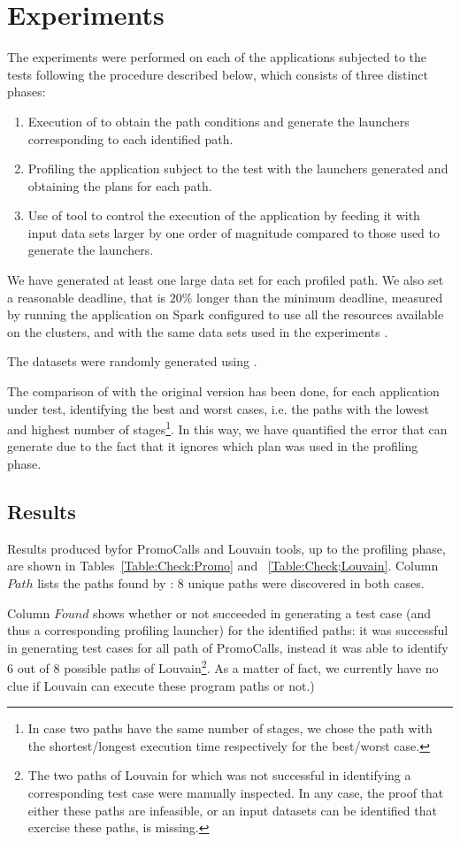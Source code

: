 \section{Experiments}\label{sec:experiments}
The experiments were performed on each of the applications subjected to the tests following the procedure described below, which consists of three distinct phases:
\begin{enumerate}[$1 $]
	\item Execution of \dSymb to obtain the path conditions and generate the launchers corresponding to each identified path.
	\item Profiling the application subject to the test with the launchers generated and obtaining the plans for each path.
	\item Use of tool to control the execution of the application by feeding it with input data sets larger by one order of magnitude compared to those used to generate the launchers.
\end{enumerate}
We have generated at least one large data set for each profiled path. We also set a reasonable deadline, that is $ 20\% $ longer than the minimum deadline, measured by running the application on Spark configured to use all the resources available on the clusters, and with the same data sets used in the experiments .

The datasets were randomly generated using \dSymb.

The comparison of \tool with the original \cSpark version has been done, for each application under test, identifying the best and worst cases, i.e. the paths with the lowest and highest number of stages\footnote{In case two paths have the same number of stages, we chose the path with the shortest/longest execution time  respectively for the best/worst case.}. In this way, we have quantified the error that \cSpark can generate due to the fact that it ignores which plan was used in the profiling phase.

\subsection{Results}
Results produced by\tool for PromoCalls and Louvain tools, up to the profiling phase, are shown in Tables~\ref{Table:Check:Promo} and ~\ref{Table:Check;Louvain}. Column $Path$ lists the paths found by \dSymb: $8$ unique paths were discovered in both cases. 

Column $Found$ shows whether or not \dSymb succeeded in generating a test case (and thus a corresponding profiling launcher) for the identified paths: it was successful in generating test cases for all path of PromoCalls, instead it was able to identify 6 out of 8 possible paths of Louvain\footnote{The two paths of Louvain for which \dSymb was not successful in identifying a corresponding test case were manually inspected. In any case, the proof that either these paths are infeasible, or an input datasets can be identified that exercise these paths, is missing.}. As a matter of fact, we currently have no clue if Louvain can execute these program paths or not.)


